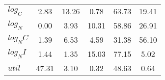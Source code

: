 \begin{center}
\begin{longtable}{lccccc}
$log_C         $	 & 	        2.83	 & 	       13.26	 & 	        0.78	 & 	       63.73	 & 	       19.41 \\ 
$log_N         $	 & 	        0.00	 & 	        3.93	 & 	       10.31	 & 	       58.86	 & 	       26.91 \\ 
$log_NC        $	 & 	        1.39	 & 	        6.53	 & 	        4.59	 & 	       31.38	 & 	       56.10 \\ 
$log_NI        $	 & 	        1.44	 & 	        1.35	 & 	       15.03	 & 	       77.15	 & 	        5.02 \\ 
$util          $	 & 	       47.31	 & 	        3.10	 & 	        0.32	 & 	       48.63	 & 	        0.64 \\ 
\end{longtable}
 \end{center}
